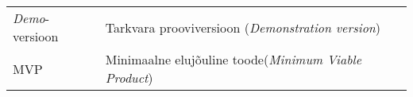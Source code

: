 \begin{longtable}{p{3cm}p{10cm}}
\textit{Demo}-versioon&Tarkvara prooviversioon (\emph{Demonstration version})\\
MVP&Minimaalne elujõuline toode(\emph{Minimum Viable Product})

\end{longtable}
\addtocounter{table}{-1} 